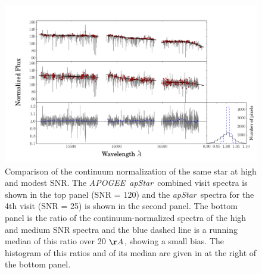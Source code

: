 \documentclass[12pt, preprint]{aastex}
\newcommand{\apogee}{\textsl{APOGEE}}
\newcommand{\apstar}{\textsl{apStar}}
\begin{document}
 \begin{figure}[!h]
  \includegraphics[width=\hsize]{./plots/SNR_continuum6.png}
  \caption{Comparison of the continuum normalization of the same star at high and modest SNR. The \apogee\ \apstar\ combined visit spectra is shown in the top panel (SNR = 120) and the \apstar\ spectra for the 4th visit (SNR = 25) is shown in the second panel. The bottom panel is the ratio of the continuum-normalized spectra of the high and medium SNR spectra and the blue dashed line is a running median of this ratio over 20 $\AA$, showing a small bias. The histogram of this ratios and of its median are given in at the right of the bottom panel.}
\label{fig:lowsnr}
\end{figure}
\end{document}
